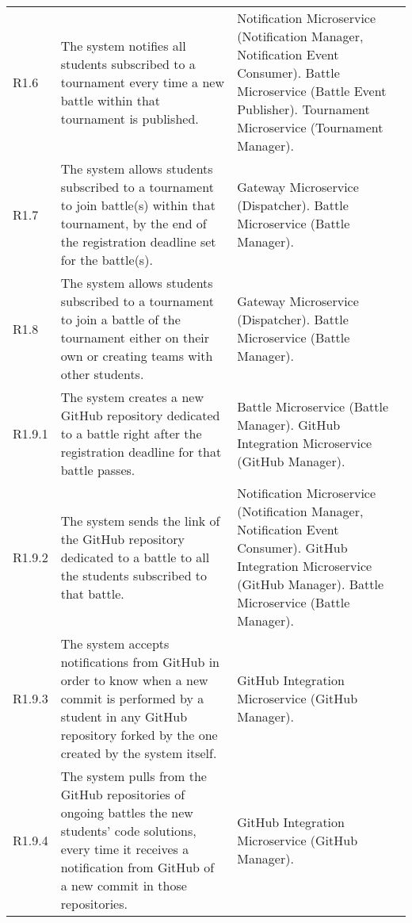 \begin{longtable}{p{1cm} p{5.5cm} p{6cm}}
 	R1.6 & The system notifies all students subscribed to a tournament every time a new battle within that tournament is published. & Notification Microservice (Notification Manager, Notification Event Consumer). \newline Battle Microservice (Battle Event Publisher). \newline Tournament Microservice (Tournament Manager).\\
 	
 	R1.7 & The system allows students subscribed to a tournament to join battle(s) within that tournament, by the end of the registration deadline set for the battle(s). & Gateway Microservice (Dispatcher). \newline Battle Microservice (Battle Manager).\\
 	
 	R1.8 & The system allows students subscribed to a tournament to join a battle of the tournament either on their own or creating teams with other students. & Gateway Microservice (Dispatcher). \newline Battle Microservice (Battle Manager).\\
 	
 	R1.9.1 & The system creates a new GitHub repository dedicated to a battle right after the
 	registration deadline for that battle passes. & Battle Microservice (Battle Manager). \newline GitHub Integration Microservice (GitHub Manager).\\
 	
 	R1.9.2 & The system sends the link of the GitHub repository dedicated to a battle to all the students subscribed to that battle. & Notification Microservice (Notification Manager, Notification Event Consumer). \newline GitHub Integration Microservice (GitHub Manager). \newline Battle Microservice (Battle Manager).\\
 	
 	R1.9.3 & The system accepts notifications from GitHub in order to know when a new commit
 	is performed by a student in any GitHub repository forked by the one created by the system
 	itself.& GitHub Integration Microservice (GitHub Manager).\\
 	
 	R1.9.4 & The system pulls from the GitHub repositories of ongoing battles the new students’
 	code solutions, every time it receives a notification from GitHub of a new commit in those
 	repositories. & GitHub Integration Microservice (GitHub Manager).\\
 	

\end{longtable}
